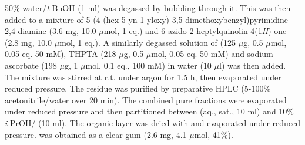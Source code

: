 50\% water/\textit{t}-BuOH (1 ml) was degassed by bubbling  through it. This was then added to a mixture of 5-(4-(hex-5-yn-1-yloxy)-3,5-dimethoxybenzyl)pyrimidine-2,4-diamine  (3.6 mg, 10.0 $\mu$mol, 1 eq.) and 6-azido-2-heptylquinolin-4(1\textit{H})-one  (2.8 mg, 10.0 $\mu$mol, 1 eq.).
A similarly degassed solution of 
 (125 $\mu$g, 0.5 $\mu$mol, 0.05 eq. 50 mM), 
THPTA (218 $\mu$g, 0.5 $\mu$mol, 0.05 eq. 50 mM) and 
sodium ascorbate (198 $\mu$g, 1 $\mu$mol, 0.1 eq., 100 mM) in water (10 $\mu$l) was then added. 
The mixture was stirred at r.t. under argon for 1.5 h, then evaporated under reduced pressure. The residue was purified by preparative HPLC (5-100\% acetonitrile/water over 20 min).
The combined pure fractions were evaporated under reduced pressure and then partitioned between  (aq., sat., 10 ml) and 10\% \textit{i}-PrOH/ (10 ml). The organic layer was dried with  and evaporated under reduced pressure.
 was obtained as a clear gum (2.6 mg, 4.1 $\mu$mol, 41\%).
\\[1\baselineskip]
\\[1\baselineskip]
\\[1\baselineskip]
